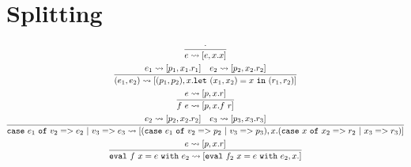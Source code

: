 \documentclass{article}
\begin{document}
\section{Splitting}
\begin{gather}
\infer {e \rightsquigarrow [e,x.x]}{\cdot} \\
\infer {(e_1,e_2) \rightsquigarrow [(p_1,p_2),x.\mathtt{let}~(x_1,x_2)=x~\mathtt{in}~(r_1,r_2)]}{e_1 \rightsquigarrow [p_1,x_1.r_1] & e_2 \rightsquigarrow [p_2,x_2.r_2]} \\
\infer {f~e \rightsquigarrow [p,x.f~r]}{e \rightsquigarrow [p,x.r]} \\
\infer {\mathtt{case}~e_1~\mathtt{of}~v_2=>e_2~|~v_3=>e_3 \rightsquigarrow [(\mathtt{case}~e_1~\mathtt{of}~v_2=>p_2~|~v_3=>p_3), x.(\mathtt{case}~x~\mathtt{of}~x_2=>r_2~|~x_3=>r_3)]}{e_2 \rightsquigarrow [p_2,x_2.r_2] & e_3 \rightsquigarrow [p_3,x_3.r_3]} \\
\infer {\mathtt{eval}~f~x=e~\mathtt{with}~e_2 \rightsquigarrow [\mathtt{eval}~f_2~x=e~\mathtt{with}~e_2, x.]}{e \rightsquigarrow [p,x.r]} 
\end{gather}
\end{document}
